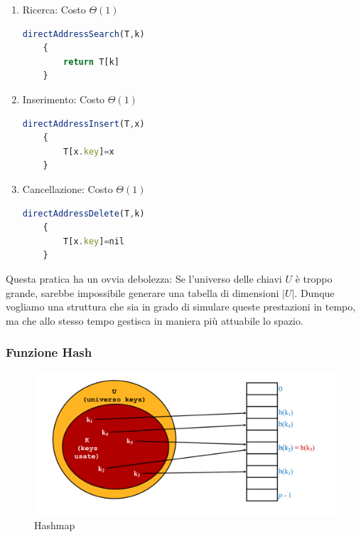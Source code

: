 \documentclass{article}
\begin{document}
\begin{enumerate}
    \item Ricerca: Costo $\Theta(1)$
    
    \begin{lstlisting}[language=JavaScript]
    directAddressSearch(T,k)
    {
        return T[k]
    }
    \end{lstlisting}
    \item Inserimento: Costo $\Theta(1)$
    
    \begin{lstlisting}[language=JavaScript]
    directAddressInsert(T,x)
    {
        T[x.key]=x
    }
    \end{lstlisting}
    \item Cancellazione: Costo $\Theta(1)$
    
    \begin{lstlisting}[language=JavaScript]
    directAddressDelete(T,k)
    {
        T[x.key]=nil
    }
    \end{lstlisting}
\end{enumerate}

Questa pratica ha un ovvia debolezza: Se l'universo delle chiavi $U$ è troppo grande, sarebbe impossibile generare una tabella di dimensioni $|U|$. Dunque vogliamo una struttura che sia in grado di simulare queste prestazioni in tempo, ma che allo stesso tempo gestisca in maniera più attuabile lo spazio.

\newpage

\subsubsection{Funzione Hash}

\begin{figure}[htbp]
        \center
        \includegraphics[scale=0.35]{img/hashMap1.png}
        \caption{Hashmap}
    \end{figure}
\end{document}
